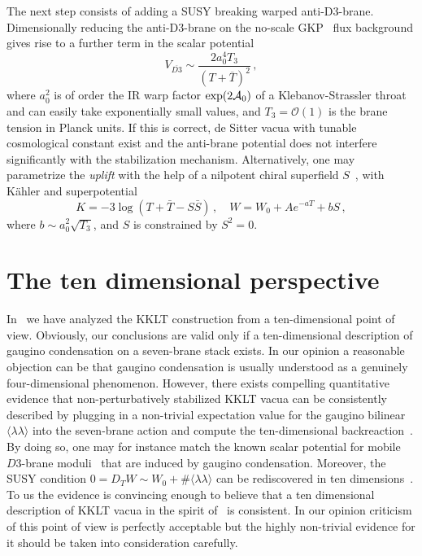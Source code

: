 \documentclass[aps,prd,amsmath,amsfonts,a4paper,11pt,reprint,twocolumn,square,numbers,showpacs,superscriptaddress,floatfix,sort&compress,nofootinbib]{revtex4-1}
\begin{document}
 
The next step consists of adding a SUSY breaking warped anti-D3-brane. Dimensionally reducing the anti-D3-brane on the no-scale GKP~\cite{Giddings:2001yu} flux background gives rise to a further term in the scalar potential~\cite{Kachru:2002gs}
\begin{equation}
V_{\overline{D3}}\sim \frac{2a_0^4 T_3}{(T+\overline{T})^2}\, ,
\end{equation}
where $a_0^2$ is of order the IR warp factor $\exp(2{\cal A}_0)$ of a Klebanov-Strassler throat and can easily take exponentially small values, and $T_3=\mathcal{O}(1)$ is the brane tension in Planck units. If this is correct, de Sitter vacua with tunable cosmological constant exist and the anti-brane potential does not interfere significantly with the stabilization mechanism. Alternatively, one may parametrize the \textit{uplift} with the help of a nilpotent chiral superfield $S$~\cite{Ferrara:2014kva,Kallosh:2014wsa,Bergshoeff:2015jxa,Kallosh:2015nia}, with K\"ahler and superpotential
\begin{equation}\label{eq:WK_KKLTUplift1}
K=-3\log(T+\bar{T}-S\bar{S})\, ,\quad W=W_0+Ae^{-aT}+bS\, ,
\end{equation}
where $b\sim a_0^2\sqrt{T_3}$, and $S$ is constrained by $S^2=0$.  

\section{The ten dimensional perspective}
In~\cite{Moritz:2017xto} we have analyzed the KKLT construction from a ten-dimensional point of view. Obviously, our conclusions are valid only if a ten-dimensional description of gaugino condensation on a seven-brane stack exists. In our opinion a reasonable objection can be that gaugino condensation is usually understood as a genuinely four-dimensional phenomenon. However, there exists compelling quantitative evidence that non-perturbatively stabilized KKLT vacua can be consistently described by plugging in a non-trivial expectation value for the gaugino bilinear $\langle\lambda\lambda\rangle$ into the seven-brane action and compute the ten-dimensional backreaction~\cite{Baumann:2010sx,Heidenreich:2010ad,Dymarsky:2010mf}. By doing so, one may for instance match the known scalar potential for mobile $D3$-brane moduli~\cite{Berg:2004ek,Baumann:2006th,Baumann:2010sx} that are induced by gaugino condensation. Moreover, the SUSY condition $0=D_T W\sim W_0+\#\langle\lambda\lambda\rangle$ can be rediscovered in ten dimensions~\cite{Moritz:2017xto}. To us the evidence is convincing enough to believe that a ten dimensional description of KKLT vacua in the spirit of~\cite{Baumann:2010sx,Heidenreich:2010ad,Dymarsky:2010mf} is consistent. In our opinion criticism of this point of view is perfectly acceptable but the highly non-trivial evidence for it should be taken into consideration carefully.
\end{document}
